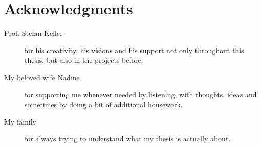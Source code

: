 
\chapter*{Acknowledgments}

\begin{description}
    \item[Prof. Stefan Keller] for his creativity, his visions and his support not only throughout this thesis, but also in the projects before.
    \item[My beloved wife Nadine] for supporting me whenever needed by listening, with thoughts, ideas and sometimes by doing a bit of additional housework.
    \item[My family] for always trying to understand what my thesis is actually about.
\end{description}